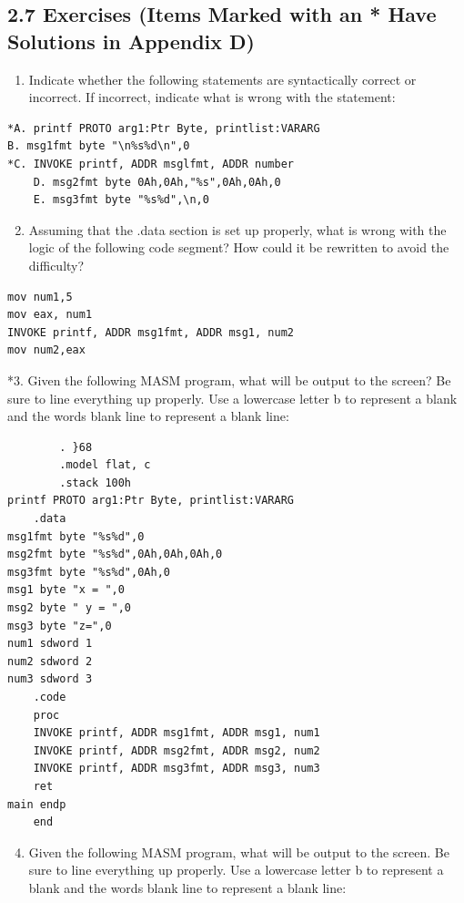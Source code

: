 \documentclass[10pt]{book}
\begin{document}
\subsection*{2.7 Exercises (Items Marked with an * Have Solutions in Appendix D)}
\begin{enumerate}
  \item Indicate whether the following statements are syntactically correct or incorrect. If incorrect, indicate what is wrong with the statement:
\end{enumerate}

\begin{verbatim}
*A. printf PROTO arg1:Ptr Byte, printlist:VARARG
B. msg1fmt byte "\n%s%d\n",0
*C. INVOKE printf, ADDR msglfmt, ADDR number
    D. msg2fmt byte 0Ah,0Ah,"%s",0Ah,0Ah,0
    E. msg3fmt byte "%s%d",\n,0
\end{verbatim}

\begin{enumerate}
  \setcounter{enumi}{1}
  \item Assuming that the .data section is set up properly, what is wrong with the logic of the following code segment? How could it be rewritten to avoid the difficulty?
\end{enumerate}

\begin{verbatim}
mov num1,5
mov eax, num1
INVOKE printf, ADDR msg1fmt, ADDR msg1, num2
mov num2,eax
\end{verbatim}

*3. Given the following MASM program, what will be output to the screen? Be sure to line everything up properly. Use a lowercase letter b to represent a blank and the words blank line to represent a blank line:

\begin{verbatim}
        . }68
        .model flat, c
        .stack 100h
printf PROTO arg1:Ptr Byte, printlist:VARARG
    .data
msg1fmt byte "%s%d",0
msg2fmt byte "%s%d",0Ah,0Ah,0Ah,0
msg3fmt byte "%s%d",0Ah,0
msg1 byte "x = ",0
msg2 byte " y = ",0
msg3 byte "z=",0
num1 sdword 1
num2 sdword 2
num3 sdword 3
    .code
    proc
    INVOKE printf, ADDR msg1fmt, ADDR msg1, num1
    INVOKE printf, ADDR msg2fmt, ADDR msg2, num2
    INVOKE printf, ADDR msg3fmt, ADDR msg3, num3
    ret
main endp
    end
\end{verbatim}

\begin{enumerate}
  \setcounter{enumi}{3}
  \item Given the following MASM program, what will be output to the screen. Be sure to line everything up properly. Use a lowercase letter b to represent a blank and the words blank line to represent a blank line:
\end{enumerate}
\end{document}
